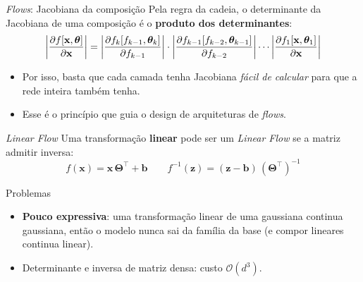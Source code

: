 \documentclass[aspectratio=169,xcolor=dvipsnames]{beamer}
\begin{document}
  \begin{frame}{\textit{Flows}: Jacobiana da composição}
    Pela regra da cadeia, o determinante da Jacobiana de uma composição
    é o \textbf{produto dos determinantes}:
    \vspace{0.3em}
    \[
      \left|\frac{\partial f[\mathbf{x},\bm{\theta}]}{\partial \mathbf{x}}\right|
      = \left|\frac{\partial f_{k}[f_{k-1},\bm{\theta}_k]}{\partial f_{k-1}}\right|
      \cdot
      \left|\frac{\partial f_{k-1}[f_{k-2},\bm{\theta}_{k-1}]}{\partial f_{k-2}}\right|
      \cdots
      \left|\frac{\partial f_{1}[\mathbf{x},\bm{\theta}_1]}{\partial \mathbf{x}}\right|
    \]
    \vspace{0.3em}
    \begin{itemize}
      \item Por isso, basta que cada camada tenha Jacobiana \emph{fácil
      de calcular} para que a rede inteira também tenha.
      \item Esse é o princípio que guia o design de arquiteturas de
      \textit{flows}.
    \end{itemize}
  \end{frame}

  \begin{frame}{\textit{Linear Flow}}
    Uma transformação \textbf{linear} pode ser um \textit{Linear Flow}
    se a matriz admitir inversa:
    \vspace{0.3em}
    \[
      f(\mathbf{x}) = \mathbf{x}\,\mathbf{\Theta}^{\top} + \mathbf{b}
      \qquad
      f^{-1}(\mathbf{z}) = (\mathbf{z} - \mathbf{b})\,(\mathbf{\Theta}^{\top})^{-1}
    \]
    \vspace{0.3em}
    \begin{alertblock}{Problemas}
      \begin{itemize}
        \item \textbf{Pouco expressiva}: uma transformação linear de uma
        gaussiana continua gaussiana, então o modelo nunca sai da família
        da base (e compor lineares continua linear).
        \item Determinante e inversa de matriz densa: custo
        $\mathcal{O}(d^{3})$.
      \end{itemize}
    \end{alertblock}
  \end{frame}
\end{document}
